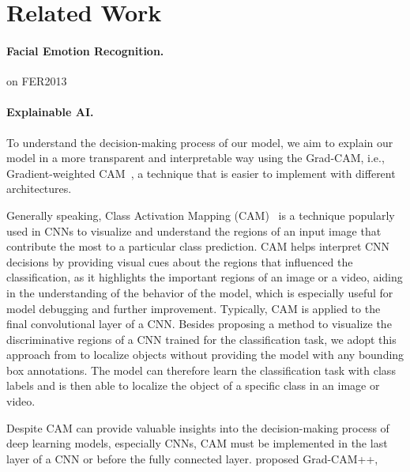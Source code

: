 \section{Related Work}
\label{sec:related}

\paragraph{Facial Emotion Recognition.}
\citet{PhamVT20} on FER2013

\paragraph{Explainable AI.}
To understand the decision-making process of our model, 
we aim to explain our model in a more transparent and interpretable way using the Grad-CAM, 
i.e., Gradient-weighted CAM~\cite{SelvarajuCDVPB17}, 
a technique that is easier to implement with different architectures. 

Generally speaking, 
Class Activation Mapping (CAM)~\cite{ZhouKLOT16} is a technique popularly used in CNNs to visualize and understand the regions of an input image that contribute the most to a particular class prediction. 
CAM helps interpret CNN decisions by providing visual cues about the regions that influenced the classification, 
as it highlights the important regions of an image or a video, 
aiding in the understanding of the behavior of the model, 
which is especially useful for model debugging and further improvement. 
Typically,
CAM is applied to the final convolutional layer of a CNN. 
Besides proposing a method to visualize the discriminative regions of a CNN trained for the classification task, 
we adopt this approach from \citet{ZhouKLOT16} to localize objects without providing the model with any bounding box annotations. 
The model can therefore learn the classification task with class labels and is then able to localize the object of a specific class in an image or video. 

Despite CAM can provide valuable insights into the decision-making process of deep learning models, 
especially CNNs, 
CAM must be implemented in the last layer of a CNN or before the fully connected layer.
\citet{chattopadhay2018grad} proposed Grad-CAM++,

